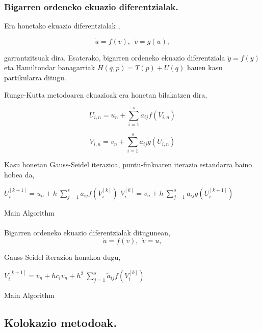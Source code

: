 \subsubsection*{Bigarren ordeneko ekuazio diferentzialak.}

Era honetako ekuazio diferentzialak ,

\begin{equation*}
\dot{u}=f(v), \ \ \dot{v}=g(u),
\end{equation*}

garrantzitsuak dira. Esaterako, bigarren ordeneko ekuazio diferentziala $\ddot{y}=f(y)$ eta Hamiltondar banagarriak $H(q,p)=T(p)+U(q)$ hauen kasu partikularra ditugu.

Runge-Kutta metodoaren ekuazioak era honetan bilakatzen dira,

\begin{equation*}
U_{i,n}=u_n+ \sum\limits_{i=1}^{s} a_{ij} f(V_{i,n})
\end{equation*}

\begin{equation*}
V_{i,n}=v_n+ \sum\limits_{i=1}^{s} a_{ij} g(U_{i,n})
\end{equation*}

Kasu honetan Gauss-Seidel iterazioa, puntu-finkoaren iterazio estandarra baino hobea da,

\begin{algorithm}[H]
  {
   $U_{i}^{[k+1]}=u_{n}+ h \ \sum\limits_{j=1}^{s} a_{ij} f(V_i^{[k]}) $\; 
   $V_{i}^{[k]}=v_{n}+ h \ \sum\limits_{j=1}^{s} a_{ij} g(U_i^{[k+1]}) $\; 
  }
 \caption{Main Algorithm}
\end{algorithm}
 
\paragraph*{}Bigarren ordeneko ekuazio diferentzialak ditugunean,
\begin{equation*}
\dot{u}=f(v), \ \ \dot{v}=u,
\end{equation*}

Gauss-Seidel iterazioa honakoa dugu,

\begin{algorithm}[H]
  {
   $V_{i}^{[k+1]}=v_{n}+h c_i v_{n}+ h^2 \ \sum\limits_{j=1}^{s} \tilde{a}_{ij} f(V_i^{[k]}) $\;  
  }
 \caption{Main Algorithm}
\end{algorithm} 


 

\subsection{Kolokazio metodoak.}


